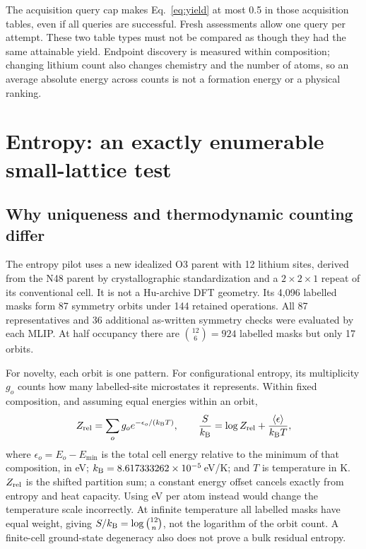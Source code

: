 \documentclass[11pt]{article}
\newcommand{\kb}{k_{\rm B}}
\begin{document}
The acquisition query cap makes Eq.~\ref{eq:yield} at most 0.5 in those
acquisition tables, even if all queries are successful. Fresh assessments
allow one query per attempt. These two table types must not be compared as
though they had the same attainable yield. Endpoint discovery is measured
within composition; changing lithium count also changes chemistry and the
number of atoms, so an average absolute energy across counts is not a
formation energy or a physical ranking.



\section{Entropy: an exactly enumerable small-lattice test}
\subsection{Why uniqueness and thermodynamic counting differ}
The entropy pilot uses a new idealized O3 parent with 12 lithium sites,
derived from the N48 parent by crystallographic standardization and a
$2\times2\times1$ repeat of its conventional cell. It is not a Hu-archive
DFT geometry. Its 4,096 labelled masks form 87 symmetry orbits under 144
retained operations. All 87 representatives and 36 additional as-written
symmetry checks were evaluated by each MLIP. At half occupancy there are
$\binom{12}{6}=924$ labelled masks but only 17 orbits.

For novelty, each orbit is one pattern. For configurational entropy, its
multiplicity $g_o$ counts how many labelled-site microstates it represents.
Within fixed composition, and assuming equal energies within an orbit,
\begin{equation}
Z_{\rm rel}=\sum_o g_o e^{-\epsilon_o/(\kb T)},\qquad
\frac{S}{\kb}=\log Z_{\rm rel}+\frac{\langle\epsilon\rangle}{\kb T},
\label{eq:entropy}
\end{equation}
where $\epsilon_o=E_o-E_{\min}$ is the total cell energy relative to the
minimum of that composition, in eV; $\kb=8.617333262\times10^{-5}$\,eV/K;
and $T$ is temperature in K. $Z_{\rm rel}$ is the shifted partition sum;
a constant energy offset cancels exactly from entropy and heat capacity.
Using eV per atom instead would change the temperature scale incorrectly.
At infinite temperature all labelled masks have equal weight, giving
$S/\kb=\log\binom{12}{n}$, not the logarithm of the orbit count. A finite-cell
ground-state degeneracy also does not prove a bulk residual entropy.
\end{document}
